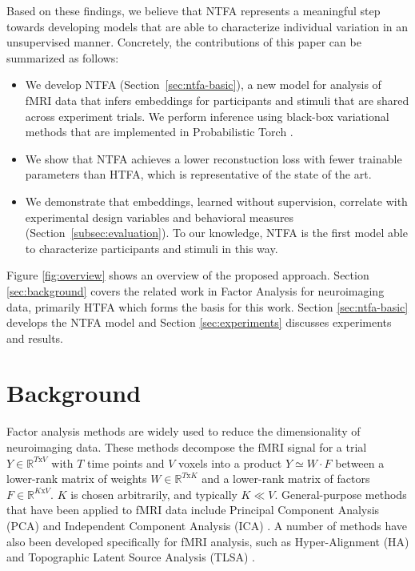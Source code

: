 \documentclass[twoside]{article}
\begin{document}
Based on these findings, we believe that NTFA represents a meaningful step towards developing models that are able to characterize individual variation in an unsupervised manner. Concretely, the contributions of this paper can be summarized as follows:

\begin{itemize}[labelwidth=0.5em, 
                labelsep=0.5em, 
                leftmargin=1.0em,
                topsep=0em,
                label={\tiny\raisebox{0.7ex}{\textbullet}}]
    \item We develop NTFA (Section~\ref{sec:ntfa-basic}), a new model for analysis of fMRI data that infers embeddings for participants and stimuli that are shared across experiment trials. We perform inference using black-box variational methods that are implemented in Probabilistic Torch \citep{narayanaswamy2017learning}.
    \item We show that NTFA achieves a lower reconstuction loss with fewer trainable parameters than HTFA, which is representative of the state of the art.
    \item We demonstrate that embeddings, learned without supervision, correlate with experimental design variables and behavioral measures (Section~\ref{subsec:evaluation}). To our knowledge, NTFA is the first model able to characterize participants and stimuli in this way.
\end{itemize}

Figure \ref{fig:overview} shows an overview of the proposed approach. Section \ref{sec:background} covers the related work in Factor Analysis for neuroimaging data, primarily HTFA which forms the basis for this work. Section \ref{sec:ntfa-basic} develops the NTFA model and Section \ref{sec:experiments} discusses experiments and results.

\vspace{-1em}
\section{Background}
\vspace{-1em}
\label{sec:background}

Factor analysis methods are widely used to reduce the dimensionality of neuroimaging data. These methods decompose the fMRI signal for a trial $Y \in \mathbb{R}^{T\text{x}V}$ with $T$ time points and $V$ voxels into a product $Y \simeq W \cdot F$ between a lower-rank matrix of weights $W \in \mathbb{R}^{T\text{x}K}$ and a lower-rank matrix of factors $F \in \mathbb{R}^{K\text{x}V}$.  $K$ is chosen arbitrarily, and typically $K \ll V$.  General-purpose methods that have been applied to fMRI data include Principal Component Analysis (PCA) \citep{abdi2010principal} and Independent Component Analysis (ICA) \citep{hyvarinen2001independent}. A number of methods have also been developed specifically for fMRI analysis, such as Hyper-Alignment (HA) \citep{haxby2011common} and Topographic Latent Source Analysis (TLSA) \citep{gershman2011topographic}.
\end{document}
